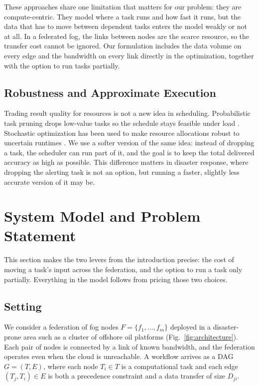 \documentclass[conference]{IEEEtran}
\begin{document}
These approaches share one limitation that matters for our problem: they are compute-centric. They model where a task runs and how fast it runs, but the data that has to move between dependent tasks enters the model weakly or not at all. In a federated fog, the links between nodes are the scarce resource, so the transfer cost cannot be ignored. Our formulation includes the data volume on every edge and the bandwidth on every link directly in the optimization, together with the option to run tasks partially.

\subsection{Robustness and Approximate Execution}

Trading result quality for resources is not a new idea in scheduling. Probabilistic task pruning drops low-value tasks so the schedule stays feasible under load \cite{gentry2019taskpruning}. Stochastic optimization has been used to make resource allocations robust to uncertain runtimes \cite{Salehi2016}. We use a softer version of the same idea: instead of dropping a task, the scheduler can run part of it, and the goal is to keep the total delivered accuracy as high as possible. This difference matters in disaster response, where dropping the alerting task is not an option, but running a faster, slightly less accurate version of it may be.

\section{System Model and Problem Statement}
\label{sec:model}

This section makes the two levers from the introduction precise: the cost of moving a task's input across the federation, and the option to run a task only partially. Everything in the model follows from pricing those two choices.

\subsection{Setting}

We consider a federation of fog nodes $F=\{f_1,\ldots,f_m\}$ deployed in a disaster-prone area such as a cluster of offshore oil platforms (Fig.~\ref{fig:architecture}). Each pair of nodes is connected by a link of known bandwidth, and the federation operates even when the cloud is unreachable. A workflow arrives as a DAG $G=(T,E)$, where each node $T_i\in T$ is a computational task and each edge $(T_j,T_i)\in E$ is both a precedence constraint and a data transfer of size $D_{ji}$.
\end{document}

